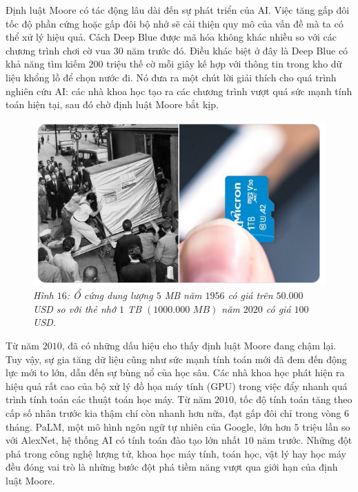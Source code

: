 \begin{multicols}{2}
	\vskip 0.1cm
	Định luật Moore có tác động lâu dài đến sự phát triển của AI. Việc tăng gấp đôi tốc độ phần cứng  hoặc gấp đôi bộ nhớ sẽ cải thiện quy mô của vấn đề mà ta có thể xử lý hiệu quả. Cách Deep Blue được mã hóa không khác nhiều so với các chương trình chơi cờ vua $30$ năm trước đó. Điều khác biệt ở đây là Deep Blue có khả năng tìm kiếm $200$ triệu thế cờ mỗi giây kế hợp với thông tin trong kho dữ liệu khổng lồ để chọn nước đi. Nó đưa ra một chút lời giải thích cho quá trình nghiên cứu AI: các nhà khoa học tạo ra các chương trình vượt quá sức mạnh tính toán hiện tại, sau đó chờ định luật Moore bắt kịp.
	\begin{figure}[H]
		\vspace*{-5pt}
		\centering
		\captionsetup{labelformat= empty, justification=centering}
		\includegraphics[width= 1\linewidth]{Disk.png}
		\caption{\small\textit{\color{timhieukhoahoc}Hình $16$: Ổ cứng dung lượng $5$ MB năm $1956$ có giá trên $50{.}000$ USD so với thẻ nhớ $1$ TB $(1000{.}000 \,\,MB)$ năm $2020$ có giá $100$ USD.}}
		\vspace*{-10pt}
	\end{figure}
	Từ năm $2010$, đã có những dấu hiệu cho thấy định luật Moore đang chậm lại. Tuy vậy, sự gia tăng dữ liệu cũng như sức mạnh tính toán mới đã đem đến động lực mới to lớn, dẫn đến sự bùng nổ của học sâu. Các nhà khoa học phát hiện ra hiệu quả rất cao của bộ xử lý đồ họa máy tính (GPU) trong việc đẩy nhanh quá trình tính toán các thuật toán học máy. Từ năm $2010$, tốc độ tính toán tăng theo cấp số nhân trước kia thậm chí còn nhanh hơn nữa, đạt gấp đôi chỉ trong vòng $6$ tháng. PaLM, một mô hình ngôn ngữ tự nhiên của Google, lớn hơn $5$ triệu lần so với AlexNet, hệ thống AI có tính toán đào tạo lớn nhất $10$ năm trước. Những đột phá trong công nghệ lượng tử, khoa học máy tính, toán học, vật lý hay học máy đều đóng vai trò là những bước đột phá tiềm năng vượt qua giới hạn của định luật Moore.

\end{multicols}
